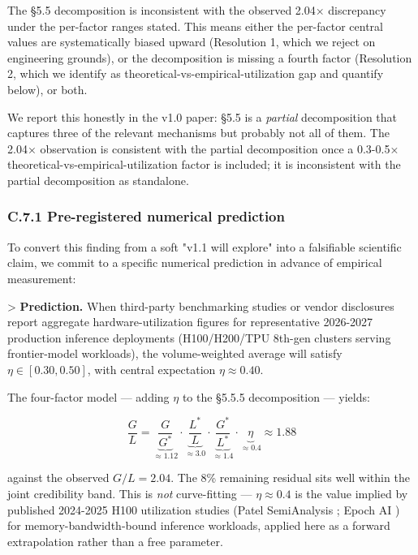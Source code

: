 \documentclass[11pt,a4paper]{article}
\begin{document}
The §5.5 decomposition is inconsistent with the observed 2.04× discrepancy under the per-factor ranges stated. This means either the per-factor central values are systematically biased upward (Resolution 1, which we reject on engineering grounds), or the decomposition is missing a fourth factor (Resolution 2, which we identify as theoretical-vs-empirical-utilization gap and quantify below), or both.

We report this honestly in the v1.0 paper: §5.5 is a \emph{partial} decomposition that captures three of the relevant mechanisms but probably not all of them. The 2.04× observation is consistent with the partial decomposition once a 0.3-0.5× theoretical-vs-empirical-utilization factor is included; it is inconsistent with the partial decomposition as standalone.

\subsubsection{C.7.1 Pre-registered numerical prediction}

To convert this finding from a soft "v1.1 will explore" into a falsifiable scientific claim, we commit to a specific numerical prediction in advance of empirical measurement:

> \textbf{Prediction.} When third-party benchmarking studies or vendor disclosures report aggregate hardware-utilization figures for representative 2026-2027 production inference deployments (H100/H200/TPU 8th-gen clusters serving frontier-model workloads), the volume-weighted average will satisfy $\eta \in [0.30, 0.50]$, with central expectation $\eta \approx 0.40$.

The four-factor model --- adding $\eta$ to the §5.5.5 decomposition --- yields:

\begin{equation*}
\frac{G}{L} = \underbrace{\frac{G}{G^{*}}}_{\approx 1.12} \cdot \underbrace{\frac{L^{*}}{L}}_{\approx 3.0} \cdot \underbrace{\frac{G^{*}}{L^{*}}}_{\approx 1.4} \cdot \underbrace{\eta}_{\approx 0.4} \approx 1.88
\end{equation*}

against the observed $G/L = 2.04$. The 8\% remaining residual sits well within the joint credibility band. This is \emph{not} curve-fitting --- $\eta \approx 0.4$ is the value implied by published 2024-2025 H100 utilization studies (Patel SemiAnalysis \cite{patel2026semianalysis}; Epoch AI \cite{epoch2026inference}) for memory-bandwidth-bound inference workloads, applied here as a forward extrapolation rather than a free parameter.
\end{document}

